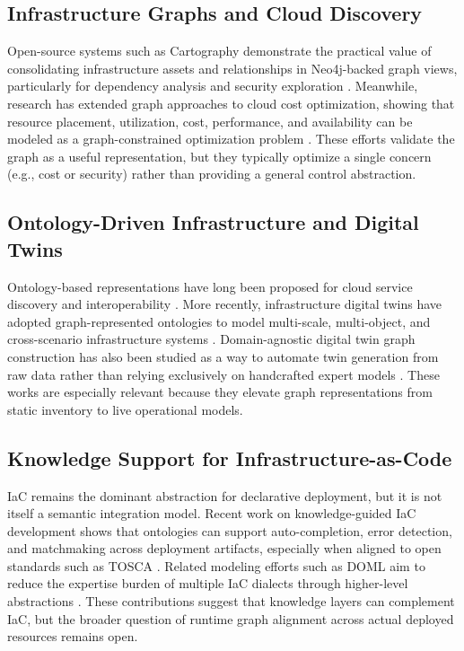 \documentclass[conference]{IEEEtran}
\begin{document}
\subsection{Infrastructure Graphs and Cloud Discovery}
Open-source systems such as Cartography demonstrate the practical value of consolidating infrastructure assets and relationships in Neo4j-backed graph views, particularly for dependency analysis and security exploration \cite{cartography2026}. Meanwhile, research has extended graph approaches to cloud cost optimization, showing that resource placement, utilization, cost, performance, and availability can be modeled as a graph-constrained optimization problem \cite{khan2024cost}. These efforts validate the graph as a useful representation, but they typically optimize a single concern (e.g., cost or security) rather than providing a general control abstraction.

\subsection{Ontology-Driven Infrastructure and Digital Twins}
Ontology-based representations have long been proposed for cloud service discovery and interoperability \cite{youssef2013cocoon}. More recently, infrastructure digital twins have adopted graph-represented ontologies to model multi-scale, multi-object, and cross-scenario infrastructure systems \cite{li2024infrastructuredt}. Domain-agnostic digital twin graph construction has also been studied as a way to automate twin generation from raw data rather than relying exclusively on handcrafted expert models \cite{du2023dtg}. These works are especially relevant because they elevate graph representations from static inventory to live operational models.

\subsection{Knowledge Support for Infrastructure-as-Code}
IaC remains the dominant abstraction for declarative deployment, but it is not itself a semantic integration model. Recent work on knowledge-guided IaC development shows that ontologies can support auto-completion, error detection, and matchmaking across deployment artifacts, especially when aligned to open standards such as TOSCA \cite{vasileiou2025iac}. Related modeling efforts such as DOML aim to reduce the expertise burden of multiple IaC dialects through higher-level abstractions \cite{doml2023}. These contributions suggest that knowledge layers can complement IaC, but the broader question of runtime graph alignment across actual deployed resources remains open.
\end{document}
